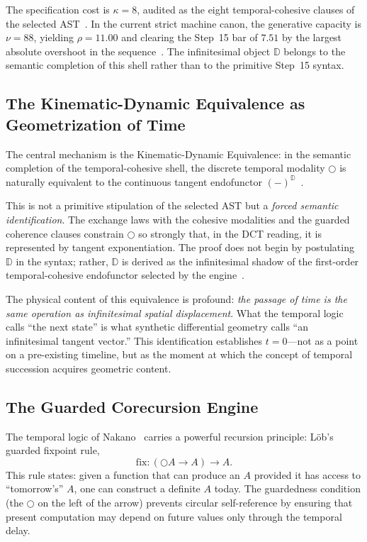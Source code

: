 \documentclass[11pt,a4paper]{article}
\theoremstyle{plain}
\theoremstyle{definition}
\theoremstyle{remark}
\newcommand{\D}{\mathbb{D}}
\newcommand{\nextmod}{\bigcirc}
\newcommand{\fix}{\mathrm{fix}}
\begin{document}
\noindent The specification cost is $\kappa = 8$, audited as the eight temporal-cohesive clauses of the selected AST~\cite{pen}.
In the current strict machine canon, the generative capacity is $\nu = 88$, yielding $\rho = 11.00$ and clearing the Step~15 bar of $7.51$ by the largest absolute overshoot in the sequence~\cite{pen}.
The infinitesimal object $\D$ belongs to the semantic completion of this shell rather than to the primitive Step~15 syntax.

\subsection{The Kinematic-Dynamic Equivalence as Geometrization of Time}
\label{sec:kde}

The central mechanism is the Kinematic-Dynamic Equivalence: in the semantic completion of the temporal-cohesive shell, the discrete temporal modality $\nextmod$ is naturally equivalent to the continuous tangent endofunctor $(-)^{\D}$~\cite{pen}.

This is not a primitive stipulation of the selected AST but a \emph{forced semantic identification}.
The exchange laws with the cohesive modalities and the guarded coherence clauses constrain $\nextmod$ so strongly that, in the DCT reading, it is represented by tangent exponentiation.
The proof does not begin by postulating $\D$ in the syntax; rather, $\D$ is derived as the infinitesimal shadow of the first-order temporal-cohesive endofunctor selected by the engine~\cite{pen}.

The physical content of this equivalence is profound: \emph{the passage of time is the same operation as infinitesimal spatial displacement}.
What the temporal logic calls ``the next state'' is what synthetic differential geometry calls ``an infinitesimal tangent vector.''
This identification establishes $t = 0$---not as a point on a pre-existing timeline, but as the moment at which the concept of temporal succession acquires geometric content.

\subsection{The Guarded Corecursion Engine}
\label{sec:corecursion}

The temporal logic of Nakano~\cite{nakano} carries a powerful recursion principle: L\"ob's guarded fixpoint rule,
\begin{equation}
\label{eq:lob}
    \fix : (\nextmod A \to A) \to A.
\end{equation}
This rule states: given a function that can produce an $A$ provided it has access to ``tomorrow's'' $A$, one can construct a definite $A$ today.
The guardedness condition (the $\nextmod$ on the left of the arrow) prevents circular self-reference by ensuring that present computation may depend on future values only through the temporal delay.
\end{document}
